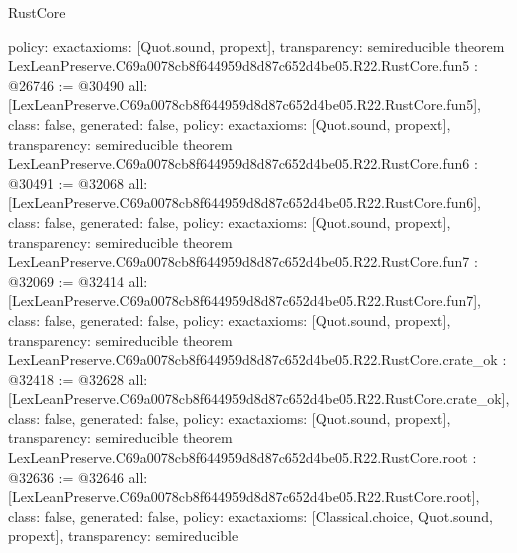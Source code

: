 \begin{lexlean}{RustCore}
\begin{coremodule}
{  policy: exact{axioms: [Quot.sound, propext]},
  transparency: semireducible
}
theorem LexLeanPreserve.C69a0078cb8f644959d8d87c652d4be05.R22.RustCore.fun5 : @26746 := @30490 {
  all: [LexLeanPreserve.C69a0078cb8f644959d8d87c652d4be05.R22.RustCore.fun5],
  class: false,
  generated: false,
  policy: exact{axioms: [Quot.sound, propext]},
  transparency: semireducible
}
theorem LexLeanPreserve.C69a0078cb8f644959d8d87c652d4be05.R22.RustCore.fun6 : @30491 := @32068 {
  all: [LexLeanPreserve.C69a0078cb8f644959d8d87c652d4be05.R22.RustCore.fun6],
  class: false,
  generated: false,
  policy: exact{axioms: [Quot.sound, propext]},
  transparency: semireducible
}
theorem LexLeanPreserve.C69a0078cb8f644959d8d87c652d4be05.R22.RustCore.fun7 : @32069 := @32414 {
  all: [LexLeanPreserve.C69a0078cb8f644959d8d87c652d4be05.R22.RustCore.fun7],
  class: false,
  generated: false,
  policy: exact{axioms: [Quot.sound, propext]},
  transparency: semireducible
}
theorem LexLeanPreserve.C69a0078cb8f644959d8d87c652d4be05.R22.RustCore.crate_ok : @32418 := @32628 {
  all: [LexLeanPreserve.C69a0078cb8f644959d8d87c652d4be05.R22.RustCore.crate_ok],
  class: false,
  generated: false,
  policy: exact{axioms: [Quot.sound, propext]},
  transparency: semireducible
}
theorem LexLeanPreserve.C69a0078cb8f644959d8d87c652d4be05.R22.RustCore.root : @32636 := @32646 {
  all: [LexLeanPreserve.C69a0078cb8f644959d8d87c652d4be05.R22.RustCore.root],
  class: false,
  generated: false,
  policy: exact{axioms: [Classical.choice, Quot.sound, propext]},
  transparency: semireducible
}


\end{coremodule}
\end{lexlean}
